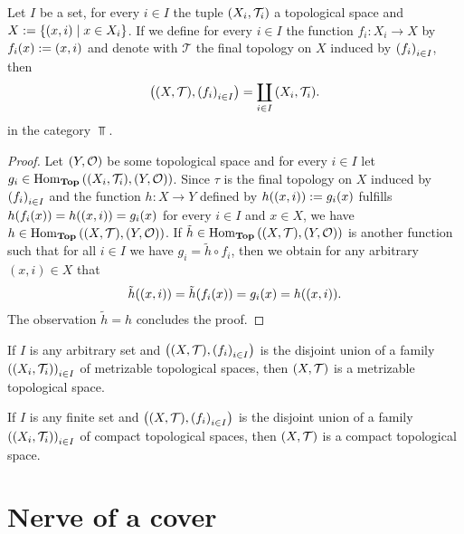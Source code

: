 \begin{lemma}\label{lemma:disj_uni_char}
	Let $I$ be a set, for every $i \in I$ the tuple ${\left ( X_i, \mathcal{T}_i \right )}$ a topological space and $X := {\left \{ {\left ( x, i \right )} \mid x \in X_i \right \}}$. If we define for every $i \in I$ the function $f_i: X_i \to X$ by $f_i(x) := {\left ( x, i \right )}$ and denote with $\mathcal{T}$ the final topology on $X$ induced by ${\left ( f_i \right )}_{i \in I}$, then
	\begin{align*}
		\pbraces{\tspace, \pbraces{f_i}_{i \in I}} = \coprod_{i \in I} \pbraces{X_i, \mathcal{T}_i}.
	\end{align*}
	in the category $\Top$. 
\end{lemma}
\begin{proof}
	Let $\tspace[Y][O]$ be some topological space and for every $i \in I$ let $g_i \in \Hom_\Top\pbraces{\pbraces{X_i, \mathcal{T}_i}, \tspace[Y][O]}$. Since $\tau$ is the final topology on $X$ induced by ${\left ( f_i \right )}_{i \in I}$ and the function $h: X \to Y$ defined by $h{\left ( (x,i) \right )} := g_i(x)$ fulfills $h{\left ( f_i(x) \right )} = h{\left ( (x,i) \right )} = g_i(x)$ for every $i \in I$ and $x \in X$, we have $h \in \Hom_\Top\pbraces{\tspace, \tspace[Y][O]}$. 
	If $\tilde{h} \in \Hom_\Top\pbraces{\tspace, \tspace[Y][O]}$ is another function such that for all $i \in I$ we have $g_i = \tilde{h} \circ f_i$, then we obtain for any arbitrary $(x,i) \in X$ that
	\begin{align*}
		\tilde{h}{\left ( (x,i) \right )} = \tilde{h}{\left ( f_i(x) \right )} = g_i(x) = h{\left ( (x,i) \right )}.
	\end{align*}
	The observation $\tilde{h} = h$ concludes the proof.
\end{proof}

\begin{lemma}\label{lemma:disjoint_met}
	If $I$ is any arbitrary set and $\pbraces{\tspace, \pbraces{f_i}_{i \in I}}$ is the disjoint union of a family $\pbraces{\indtspace}_{i \in I}$ of metrizable topological spaces, then $\tspace$ is a metrizable topological space. 
\end{lemma}

\begin{lemma}\label{lemma:disjoint_comp}
	If $I$ is any finite set and $\pbraces{\tspace, \pbraces{f_i}_{i \in I}}$ is the disjoint union of a family $\pbraces{\indtspace}_{i \in I}$ of compact topological spaces, then $\tspace$ is a compact topological space. 
\end{lemma}



\section{Nerve of a cover}

